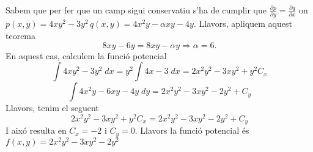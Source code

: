 \documentclass[a4paper, 12pt]{article}
\begin{document}
\begin{exercici}
\begin{enumerate}[label=\alph*)]
            \begin{solucio}
                Sabem que per fer que un camp sigui conservatiu s'ha de cumplir que $\frac{\partial p}{\partial y} = \frac{\partial q}{\partial x}$
                on $p(x,y) = 4xy^2 - 3y^2\,q(x,y) = 4x^2y-\alpha xy - 4y$.
                Llavors, apliquem aquest teorema
                $$
                8xy-6y = 8xy-\alpha y \Rightarrow \alpha = 6. 
                $$
                En aquest cas, calculem la funció potencial
                $$
                \int 4xy^2-3y^2\;dx = y^2\int 4x-3\;dx = 2x^2y^2-3xy^2+y^2C_x
                $$
                $$
                \int 4x^2y-6xy-4y\;dy = 2x^2y^2-3xy^2-2y^2+C_y
                $$
                Llavors, tenim el seguent
                $$
                2x^2y^2-3xy^2+y^2C_x = 2x^2y^2-3xy^2-2y^2+C_y
                $$
                I aixó resulta en $C_x = -2\text{ i }C_y = 0$.
                Llavors la funció potencial és $f(x,y) = 2x^2y^2-3xy^2-2y^2$
            \end{solucio}
        \end{enumerate}
    \end{exercici}
    \newpage
\end{document}
